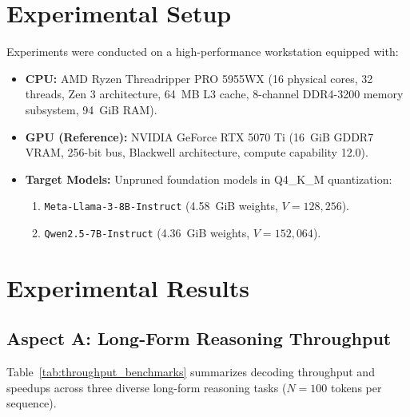 \documentclass[journal,10pt,twocolumn]{article}
\theoremstyle{definition}
\begin{document}
\section{Experimental Setup}

Experiments were conducted on a high-performance workstation equipped with:
\begin{itemize}
    \item \textbf{CPU:} AMD Ryzen Threadripper PRO 5955WX (16 physical cores, 32 threads, Zen 3 architecture, 64~MB L3 cache, 8-channel DDR4-3200 memory subsystem, 94~GiB RAM).
    \item \textbf{GPU (Reference):} NVIDIA GeForce RTX 5070 Ti (16~GiB GDDR7 VRAM, 256-bit bus, Blackwell architecture, compute capability 12.0).
    \item \textbf{Target Models:} Unpruned foundation models in Q4\_K\_M quantization:
    \begin{enumerate}
        \item \texttt{Meta-Llama-3-8B-Instruct} (4.58~GiB weights, $V=128,256$).
        \item \texttt{Qwen2.5-7B-Instruct} (4.36~GiB weights, $V=152,064$).
    \end{enumerate}
\end{itemize}

\section{Experimental Results}

\subsection{Aspect A: Long-Form Reasoning Throughput}

Table~\ref{tab:throughput_benchmarks} summarizes decoding throughput and speedups across three diverse long-form reasoning tasks ($N=100$ tokens per sequence).

\begin{table}[ht]
\centering
{}
\caption{Throughput and Speedup on Long Reasoning Tasks.}
\label{tab:throughput_benchmarks}
\end{table}
\end{document}
